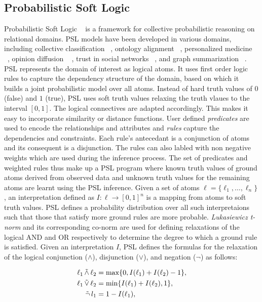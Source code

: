 \subsection{Probabilistic Soft Logic}
Probabilistic Soft Logic ~\cite{kimmig2012short} is a framework for collective probabilistic reasoning on relational domains.
PSL models have been developed in various domains, including collective classification ~\cite{broecheler2010computing}, ontology alignment ~\cite{brocheler2012probabilistic}, personalized medicine ~\cite{bach2010decision}, opinion diffusion ~\cite{bach2012scaling} , trust in social networks ~\cite{huang2012probabilistic}, and graph summarization ~\cite{memory2012graph}.
PSL represents the domain of interest as logical atoms.
It uses first order logic rules to capture the dependency structure of the domain, based on which it builds a joint probabilistic model over all atoms.
Instead of hard truth values of $0$ (false) and $1$ (true), PSL uses soft truth values relaxing the truth vlaues to the interval $[0,1]$.
The logical connectives are adapted accordingly.
This makes it easy to incorporate similarity or distance functions.
\newline
User defined \emph{predicates} are used to encode the relationships and attributes and \emph{rules} capture the  dependencies and constraints.
Each rule's antecedant is a conjunction of atoms and its consequent is a disjunction. 
The rules can also labled with non negative weights which are used during the inference process. 
The set of predicates and weighted rules thus make up a PSL program where known truth values of ground atoms derived from observed data and unknown truth values for the remaining atoms are learnt using the PSL inference.
\newline
Given a set of atoms 
$\ell = \{\ell_1,\ldots,\ell_n\}$,
an interpretation defined as 
$I : \ell \rightarrow [0,1]^n$
is a mapping from atoms to soft truth values.
PSL defines a probability distribution over all such interpretaions such that those that satisfy more ground rules are more probable.
\emph{Lukasiewicz t-norm} and its corresponding co-norm are used for defining relaxations of the logical AND and OR respectively to determine the degree to which a ground rule is satisfied.
Given an interpretation $\mathit{I}$, PSL defines the formulas for the relaxation of the logical conjunction ($\wedge$), disjunction ($\vee$), and negation ($\neg$) as follows:

\begin{align*}
\ell_1 \softand \ell_2 &= \max\{0, I(\ell_1) + I(\ell_2) - 1\},\\
\ell_1 \softor \ell_2 &= \min\{I(\ell_1) + I(\ell_2), 1\},\\
\softneg l_1 &= 1 - I(\ell_1),
\end{align*}  

